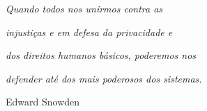 $\!$\\
$\!$\\
$\!$\\
$\!$\\
$\!$\\
$\!$\\
$\!$\\
$\!$\\
$\!$\\
$\!$\\
$\!$\\
$\!$\\
$\!$\\
$\!$\\
$\!$\\
$\!$\\
$\!$\\
$\!$\\
$\!$\\
$\!$\\
$\!$\\
$\!$\\


\begin{flushright}
\textit{Quando todos nos unirmos contra as}
\end{flushright}
\vspace{-1cm}
\begin{flushright}
\textit{injustiças e em defesa da privacidade e}
\end{flushright}
\vspace{-1cm}
\begin{flushright}
\textit{dos direitos humanos básicos, poderemos nos}
\end{flushright}
\vspace{-1cm}
\begin{flushright}
\textit{defender até dos mais poderosos dos sistemas.}
\end{flushright}
\begin{flushright}
Edward Snowden
\end{flushright}
\thispagestyle{empty}